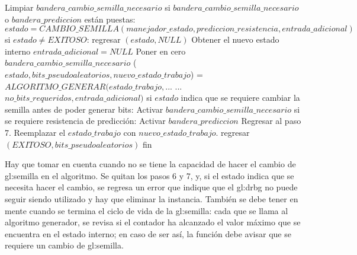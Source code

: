 \begin{description}
\begin{pseudocodigo}[caption={DRBG, generación.}, label={drbg:3}]
        Limpiar $bandera\_cambio\_semilla\_necesario$
        si $bandera\_cambio\_semilla\_necesario$ o $bandera\_prediccion$ están puestas:
          $estado = CAMBIO\_SEMILLA(manejador\_estado, prediccion\_resistencia, entrada\_adicional)$
          si $estado \neq EXITOSO$:
            regresar $(estado, NULL)$
          Obtener el nuevo estado interno
          $entrada\_adicional = NULL$
          Poner en cero $bandera\_cambio\_semilla\_necesario$ 
        ($estado, bits\_pseudoaleatorios, nuevo\_estado\_trabajo$) = $ALGORITMO\_GENERAR(estado\_trabajo,$...
          ...$no\_bits\_requeridos, entrada\_adicional)$
        si $estado$ indica que se requiere cambiar la semilla antes de poder generar bits:
          Activar $bandera\_cambio\_semilla\_necesario$
          si se requiere resistencia de predicción:
            Activar $bandera\_prediccion$
          Regresar al paso 7.
        Reemplazar el $estado\_trabajo$ con $nuevo\_estado\_trabajo$.
        regresar $(EXITOSO, bits\_pseudoaleatorios)$
      fin
    \end{pseudocodigo}
    Hay que tomar en cuenta cuando no se tiene la capacidad de hacer el cambio
    de \gls{gl:semilla} en el algoritmo. Se quitan los pasos 6 y 7, y, si el
    estado indica que se necesita hacer el cambio, se regresa un error que
    indique que el \gls{gl:drbg} no puede seguir siendo utilizado y hay que
    eliminar la instancia. También se debe tener en mente cuando se termina
    el ciclo de vida de la \gls{gl:semilla}: cada que se llama al algoritmo
    generador, se revisa si el contador ha alcanzado el valor máximo que se
    encuentra en el estado interno; en caso de ser así, la función debe avisar
    que se requiere un cambio de \gls{gl:semilla}.

\end{description}
